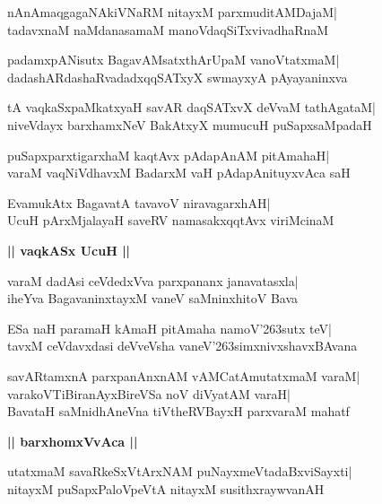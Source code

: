 \documentclass[twoside,12pt,openright]{book}
\def\S{\char'263}
\newcounter{shloka}[chapter]
\def\uvaca#1{\centerline{{\large\textbf{#1}}}}
\begin{document}
\begin{shloka}%
nAnAmaqgagaNAkiVNaRM nitayxM parxmuditAMDajaM|\\
tadavxnaM naMdanasamaM manoVdaqSiTxvivadhaRnaM
\end{shloka}

\begin{shloka}%
padamxpANisutx BagavAMsatxthArUpaM vanoVtatxmaM|\\
dadashARdashaRvadadxqqSATxyX swmayxyA pAyayaninxva
\end{shloka}

\begin{shloka}%
tA vaqkaSxpaMkatxyaH savAR daqSATxvX deVvaM tathAgataM|\\
niveVdayx barxhamxNeV BakAtxyX mumucuH puSapxsaMpadaH
\end{shloka}

\begin{shloka}%
puSapxparxtigarxhaM kaqtAvx pAdapAnAM pitAmahaH|\\
varaM vaqNiVdhavxM BadarxM vaH pAdapAnituyxvAca saH
\end{shloka}

\begin{shloka}%
EvamukAtx BagavatA tavavoV niravagarxhAH|\\
UcuH pArxMjalayaH saveRV namasakxqqtAvx viriMcinaM
\end{shloka}

\uvaca{|| vaqkASx UcuH ||}
\begin{shloka}%
varaM dadAsi ceVdedxVva parxpananx janavatasxla|\\
iheYva BagavaninxtayxM vaneV saMninxhitoV Bava
\end{shloka}

\begin{shloka}%
ESa naH paramaH kAmaH pitAmaha namoV\S sutx teV|\\
tavxM ceVdavxdasi deVveVsha vaneV\S simxnivxshavxBAvana
\end{shloka}

\begin{shloka}%
savARtamxnA parxpanAnxnAM vAMCatAmutatxmaM varaM|\\
varakoVTiBiranAyxBireVSa noV diVyatAM varaH|\\
BavataH saMnidhAneVna tiVtheRVBayxH parxvaraM mahatf
\end{shloka}

\uvaca{|| barxhomxVvAca ||}
\begin{shloka}%
utatxmaM savaRkeSxVtArxNAM puNayxmeVtadaBxviSayxti|\\
nitayxM puSapxPaloVpeVtA nitayxM susithxraywvanAH
\end{shloka}
\end{document}
